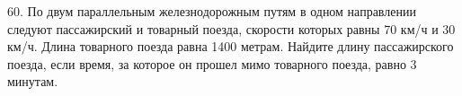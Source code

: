 60. По двум параллельным железнодорожным путям в одном направлении следуют пассажирский и товарный поезда, скорости которых равны 70 км/ч и 30 км/ч. Длина товарного поезда равна 1400 метрам. Найдите длину пассажирского поезда, если время, за которое он прошел мимо товарного поезда, равно 3 минутам.\\
